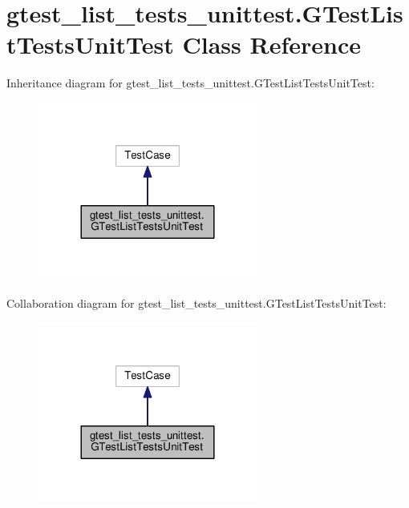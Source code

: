 \hypertarget{classgtest__list__tests__unittest_1_1GTestListTestsUnitTest}{}\section{gtest\+\_\+list\+\_\+tests\+\_\+unittest.\+G\+Test\+List\+Tests\+Unit\+Test Class Reference}
\label{classgtest__list__tests__unittest_1_1GTestListTestsUnitTest}


Inheritance diagram for gtest\+\_\+list\+\_\+tests\+\_\+unittest.\+G\+Test\+List\+Tests\+Unit\+Test\+:
\nopagebreak
\begin{figure}[H]
\begin{center}
\leavevmode
\includegraphics[width=204pt]{classgtest__list__tests__unittest_1_1GTestListTestsUnitTest__inherit__graph}
\end{center}
\end{figure}


Collaboration diagram for gtest\+\_\+list\+\_\+tests\+\_\+unittest.\+G\+Test\+List\+Tests\+Unit\+Test\+:
\nopagebreak
\begin{figure}[H]
\begin{center}
\leavevmode
\includegraphics[width=204pt]{classgtest__list__tests__unittest_1_1GTestListTestsUnitTest__coll__graph}
\end{center}
\end{figure}
